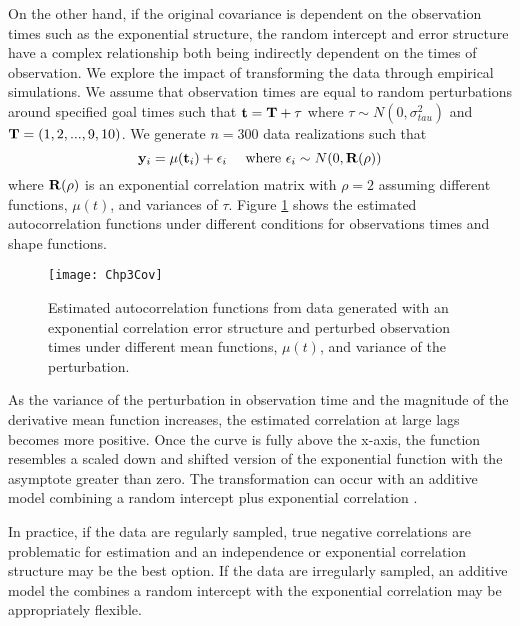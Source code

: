 On the other hand, if the original covariance is dependent on the observation times such as the exponential structure, the random intercept and error structure have a complex relationship both being indirectly dependent on the times of observation. We explore the impact of transforming the data through empirical simulations. We assume that observation times are equal to random perturbations around specified goal times such that $\mathbf t = \mathbf T + \mathbf \tau$ where $\tau\sim N(0,\sigma^{2}_{tau})$ and $\mathbf T = (1,2,...,9,10)$. We generate $n=300$ data realizations such that
$$\mathbf y_{i} = \mu(\mathbf t_{i}) + \epsilon_{i}\quad\text{ where }\epsilon_{i}\sim N(0,\mathbf R(\rho))$$
where $\mathbf R(\rho)$ is an exponential correlation matrix with $\rho=2$ assuming different functions, $\mu(t)$, and variances of $\tau$. Figure \ref{fig:cov} shows the estimated autocorrelation functions under different conditions for observations times and shape functions.
\begin{figure}
\begin{center}
\texttt{[image: Chp3Cov]}
\end{center}
\caption{Estimated autocorrelation functions from data generated with an exponential correlation error structure and perturbed observation times under different mean functions, $\mu(t)$, and variance of the perturbation.}
\label{fig:cov}
\end{figure}
As the variance of the perturbation in observation time and the magnitude of the derivative mean function increases, the estimated correlation at large lags becomes more positive. Once the curve is fully above the x-axis, the function resembles a scaled down and shifted version of the exponential function with the asymptote greater than zero. The transformation can occur with an additive model combining a random intercept plus exponential correlation  \cite{diggle2002}.

In practice, if the data are regularly sampled, true negative correlations are problematic for estimation and an independence or exponential correlation structure may be the best option. If the data are irregularly sampled, an additive model the combines a random intercept with the exponential correlation may be appropriately flexible. 

